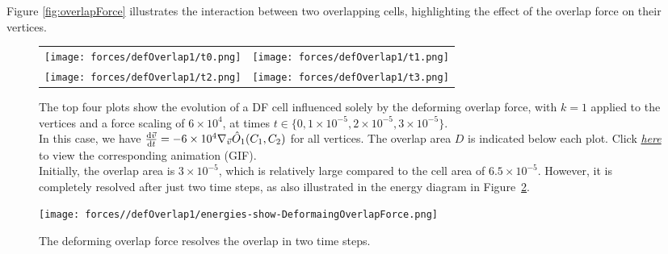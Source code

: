 Figure \ref{fig:overlapForce} illustrates the interaction between two overlapping cells, highlighting the effect of the overlap force on their vertices.

\begin{figure}[h!]
    \centering
    \begin{tabular}{cc}
        \texttt{[image: forces/defOverlap1/t0.png]} &
        \texttt{[image: forces/defOverlap1/t1.png]} \\
        \texttt{[image: forces/defOverlap1/t2.png]} &
        \texttt{[image: forces/defOverlap1/t3.png]} \\
    \end{tabular}
    \caption{
			The top four plots show the evolution of a DF cell influenced solely by the deforming overlap force, with $k=1$ applied to the vertices and a force scaling of $6\times 10^{4}$, at times $t \in \{0, 1\times 10^{-5}, 2\times 10^{-5}, 3\times 10^{-5}\}$.\\
			In this case, we have $\frac{\mathrm{d} \vec{v}}{\mathrm{d} t} = - 6\times 10^{4} \nabla_{\vec{v}} \hat{O}_1(C_1, C_2)$ for all vertices.
			The overlap area $D$ is indicated below each plot.
			Click \href{https://github.com/tivo476c/FlexibleCellModel/blob/master/figures/gifs/showForces/show-DeformaingOverlapForce.gif}{\textit{here}} to view the corresponding animation (GIF).\\
			Initially, the overlap area is $3\times 10^{-5}$, which is relatively large compared to the cell area of $6.5\times 10^{-5}$. 
			However, it is completely resolved after just two time steps, as also illustrated in the energy diagram in Figure~\ref{fig:defOverlapEnergyDiagram}.
		}
	\label{fig:deformingOverlapForce}
\end{figure}
\begin{figure}[h!]
    \centering
        \texttt{[image: forces//defOverlap1/energies-show-DeformaingOverlapForce.png]} 
    \caption{The deforming overlap force resolves the overlap in two time steps.}
	\label{fig:defOverlapEnergyDiagram}    
\end{figure}



